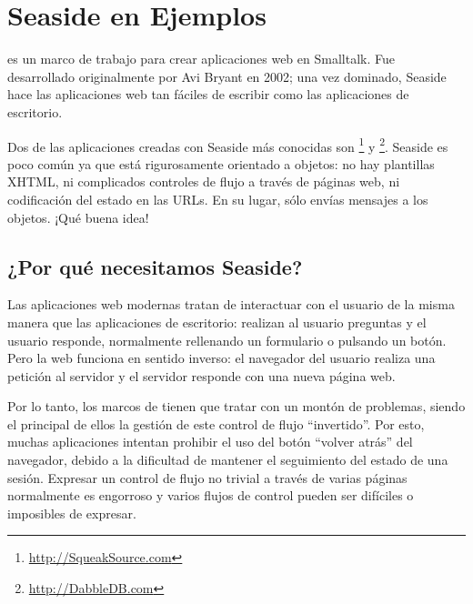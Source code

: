 \documentclass[a4paper,10pt,twoside]{book}
\begin{document}
	\sloppy
\fi
\chapter{Seaside en Ejemplos}


 es un marco de trabajo para crear aplicaciones web en Smalltalk. Fue desarrollado originalmente por Avi Bryant  en 2002; una vez dominado, Seaside hace las aplicaciones web tan fáciles de escribir como las aplicaciones de escritorio.

Dos de las aplicaciones creadas con Seaside más conocidas son \footnote{\url{http://SqueakSource.com}} y \footnote{\url{http://DabbleDB.com}}.
Seaside es poco común ya que está rigurosamente orientado a objetos: no hay plantillas XHTML, ni complicados controles de flujo a través de páginas web, ni codificación del estado en las URLs. En su lugar, sólo envías mensajes a los objetos. ¡Qué buena idea!

\section{¿Por qué necesitamos Seaside?}

Las aplicaciones web modernas tratan de interactuar con el usuario de la misma manera que las aplicaciones de escritorio: realizan al usuario preguntas y el usuario responde, normalmente rellenando un formulario o pulsando un botón. Pero la web funciona en sentido inverso: el navegador del usuario realiza una petición al servidor y el servidor responde con una nueva página web.

Por lo tanto, los marcos de  tienen que tratar con un montón de problemas, siendo el principal de ellos la gestión de este control de flujo ``invertido''.
Por esto, muchas aplicaciones intentan prohibir el uso del botón ``volver atrás'' del navegador, debido a la dificultad de mantener el seguimiento del estado de una sesión.
Expresar un control de flujo no trivial a través de varias páginas normalmente es engorroso y varios flujos de control pueden ser difíciles o imposibles de expresar.

\end{document}
